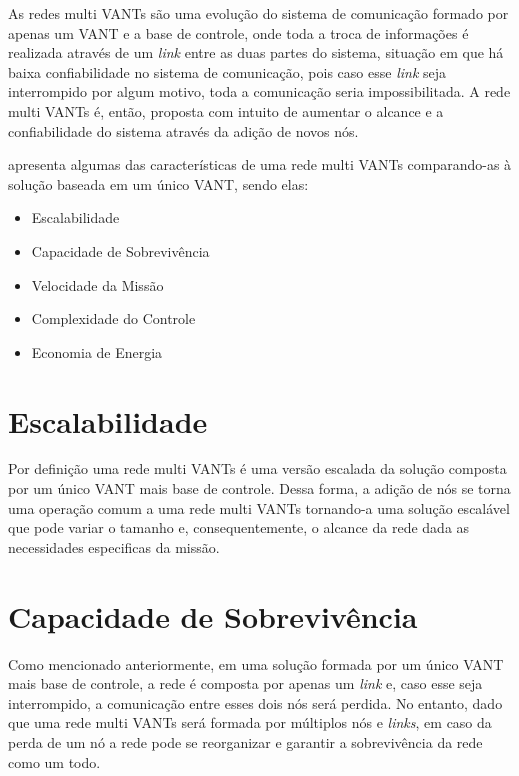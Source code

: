 \label{Cap:Requisitos}

As redes multi VANTs são uma evolução do sistema de comunicação formado por apenas um VANT e a base de controle, onde toda a troca de informações é realizada através de um \emph{link} entre as duas partes do sistema, situação em que há baixa confiabilidade no sistema de comunicação, pois caso esse \emph{link} seja interrompido por algum motivo, toda a comunicação seria impossibilitada. A rede multi VANTs é, então, proposta com intuito de aumentar o alcance e a confiabilidade do sistema através da adição de novos nós.

\cite{gupta2015survey} apresenta algumas das características de uma rede multi VANTs comparando-as à solução baseada em um único VANT, sendo elas:
\begin{itemize}
\item Escalabilidade
\item Capacidade de Sobrevivência
\item Velocidade da Missão
\item Complexidade do Controle
\item Economia de Energia
\end{itemize} 

\section{Escalabilidade}

Por definição uma rede multi VANTs é uma versão escalada da solução composta por um único VANT mais base de controle. Dessa forma, a adição de nós se torna uma operação comum a uma rede multi VANTs tornando-a uma solução escalável que pode variar o tamanho e, consequentemente, o alcance da rede dada as necessidades especificas da missão.

\section{Capacidade de Sobrevivência}

Como mencionado anteriormente, em uma solução formada por um único VANT mais base de controle, a rede é composta por apenas um \emph{link} e, caso esse seja interrompido, a comunicação entre esses dois nós será perdida. No entanto, dado que uma rede multi VANTs será formada por múltiplos nós e \emph{links}, em caso da perda de um nó a rede pode se reorganizar e garantir a sobrevivência da rede como um todo. 

